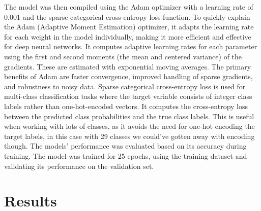 \documentclass[12pt]{article}
\begin{document}
The model was then compiled using the Adam optimizer with a learning rate of 0.001 and the sparse categorical cross-entropy loss function.
To quickly explain the Adam (Adaptive Moment Estimation) optimizer, it adapts the learning rate for each weight in the model individually, making 
it more efficient and effective for deep neural networks. It computes adaptive learning rates for each parameter using the first and second moments (the mean and centered variance) of the gradients.
These are estimated with exponential moving averages. The primary benefits of Adam are faster convergence, improved handling of sparse gradients, and 
robustness to noisy data. Sparse categorical cross-entropy loss is used for multi-class classification tasks where the target variable consists of 
integer class labels rather than one-hot-encoded vectors. It computes the cross-entropy loss between the predicted class probabilities and the true class labels.
This is useful when working with lots of classes, as it avoids the need for one-hot encoding the target labels, in this case with 29 classes we could've gotten away with encoding though.
The models' performance was evaluated based on its accuracy during training. The model was trained for 25 epochs, using the training dataset and validating its performance on the validation set.

\section*{Results}








\end{document}
